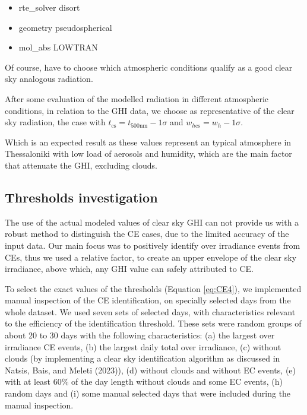 \documentclass[
]{article}
\providecommand{\tightlist}{%
  \setlength{\itemsep}{0pt}\setlength{\parskip}{0pt}}
\begin{document}
\begin{itemize}
\tightlist
\item
  rte\_solver disort
\item
  geometry pseudospherical
\item
  mol\_abs LOWTRAN
\end{itemize}

Of course, have to choose which atmospheric conditions qualify as a good clear sky analogous radiation.

After some evaluation of the modelled radiation in different atmospheric conditions, in relation to the GHI data, we choose as representative of the clear sky radiation, the case with \(t_{\text{cs}} = t_{500\text{nm}} - 1\sigma\) and \(w_{h\text{cs}} = w_h - 1\sigma\).

Which is an expected result as these values represent an typical atmosphere in Thessaloniki with low load of aerosols and humidity, which are the main factor that attenuate the GHI, excluding clouds.

\hypertarget{thresholds-investigation}{%
\subsection{Thresholds investigation}\label{thresholds-investigation}}

The use of the actual modeled values of clear sky GHI can not provide us with a
robust method to distinguish the CE cases, due to the limited accuracy of the input
data. Our main focus was to positively identify over irradiance events from CEs,
thus we used a relative factor, to create an upper envelope of the clear sky
irradiance, above which, any GHI value can safely attributed to CE.

To select the exact values of the thresholds (Equation \ref{eq:CE4}), we implemented
manual inspection of the CE identification, on specially selected days from the whole
dataset. We used seven sets of selected days, with characteristics relevant to the
efficiency of the identification threshold. These sets were random groups of about
20 to 30 days with the following characteristics:
(a) the largest over irradiance CE events,
(b) the largest daily total over irradiance,
(c) without clouds (by implementing a clear sky identification algorithm as discussed in Natsis, Bais, and Meleti (2023)),
(d) without clouds and without EC events,
(e) with at least \(60\%\) of the day length without clouds and some EC events,
(h) random days and
(i) some manual selected days that were included during the manual inspection.
\end{document}

